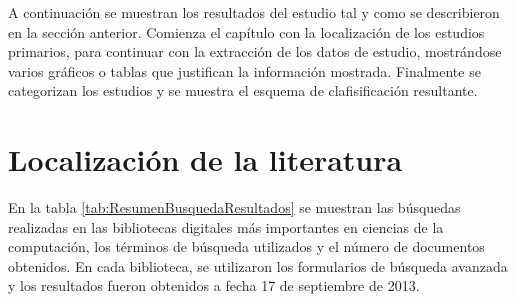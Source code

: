 


A continuación se muestran los resultados del estudio tal y como se describieron en la sección anterior. Comienza el capítulo con la localización de los estudios primarios, para continuar con la extracción de los datos de estudio, mostrándose varios gráficos o tablas que justifican la información mostrada. Finalmente se categorizan los estudios y se muestra el esquema de clafisificación resultante.

\section{Localización de la literatura}
En la tabla \ref{tab:ResumenBusquedaResultados} se muestran las búsquedas realizadas en las bibliotecas digitales más importantes en ciencias de la computación, los términos de búsqueda utilizados y el número de documentos obtenidos. En cada biblioteca, se utilizaron los formularios de búsqueda avanzada y los resultados fueron obtenidos a fecha 17 de septiembre de 2013. 



